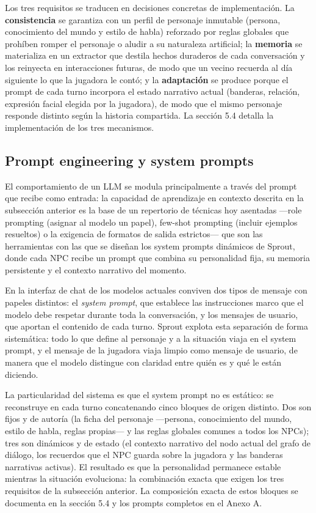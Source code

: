 \documentclass[12pt,twoside,titlepage]{report}
\begin{document}
Los tres requisitos se traducen en decisiones concretas de implementación. La \textbf{consistencia} se garantiza con un perfil de personaje inmutable (persona, conocimiento del mundo y estilo de habla) reforzado por reglas globales que prohíben romper el personaje o aludir a su naturaleza artificial; la \textbf{memoria} se materializa en un extractor que destila hechos duraderos de cada conversación y los reinyecta en interacciones futuras, de modo que un vecino recuerda al día siguiente lo que la jugadora le contó; y la \textbf{adaptación} se produce porque el prompt de cada turno incorpora el estado narrativo actual (banderas, relación, expresión facial elegida por la jugadora), de modo que el mismo personaje responde distinto según la historia compartida. La sección 5.4 detalla la implementación de los tres mecanismos.

\subsection{Prompt engineering y system prompts}

El comportamiento de un LLM se modula principalmente a través del prompt que recibe como entrada: la capacidad de aprendizaje en contexto descrita en la subsección anterior es la base de un repertorio de técnicas hoy asentadas ---role prompting (asignar al modelo un papel), few-shot prompting (incluir ejemplos resueltos) o la exigencia de formatos de salida estrictos--- que son las herramientas con las que se diseñan los system prompts dinámicos de Sprout, donde cada NPC recibe un prompt que combina su personalidad fija, su memoria persistente y el contexto narrativo del momento.

En la interfaz de chat de los modelos actuales conviven dos tipos de mensaje con papeles distintos: el \textit{system prompt}, que establece las instrucciones marco que el modelo debe respetar durante toda la conversación, y los mensajes de usuario, que aportan el contenido de cada turno. Sprout explota esta separación de forma sistemática: todo lo que define al personaje y a la situación viaja en el system prompt, y el mensaje de la jugadora viaja limpio como mensaje de usuario, de manera que el modelo distingue con claridad entre quién es y qué le están diciendo.

La particularidad del sistema es que el system prompt no es estático: se reconstruye en cada turno concatenando cinco bloques de origen distinto. Dos son fijos y de autoría (la ficha del personaje ---persona, conocimiento del mundo, estilo de habla, reglas propias--- y las reglas globales comunes a todos los NPCs); tres son dinámicos y de estado (el contexto narrativo del nodo actual del grafo de diálogo, los recuerdos que el NPC guarda sobre la jugadora y las banderas narrativas activas). El resultado es que la personalidad permanece estable mientras la situación evoluciona: la combinación exacta que exigen los tres requisitos de la subsección anterior. La composición exacta de estos bloques se documenta en la sección 5.4 y los prompts completos en el Anexo A.
\end{document}
